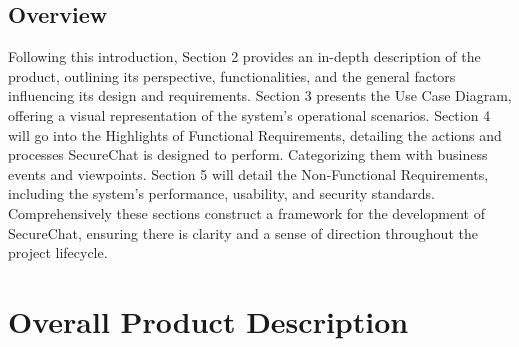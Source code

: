 \documentclass[]{article}
\begin{document}
\subsection{Overview}
\label{sub:overview}
Following this introduction, Section 2 provides an in-depth description of the product, outlining its perspective, functionalities, and the general factors influencing its design and requirements. Section 3 presents the Use Case Diagram, offering a visual representation of the system's operational scenarios. Section 4 will go into the Highlights of Functional Requirements, detailing the actions and processes SecureChat is designed to perform. Categorizing them with business events and viewpoints. Section 5 will detail the Non-Functional Requirements, including the system's performance, usability, and security standards. Comprehensively these sections construct a framework for the development of SecureChat, ensuring there is clarity and a sense of direction throughout the project lifecycle.


\section{Overall Product Description}
\label{sec:overall_description}
\end{document}
